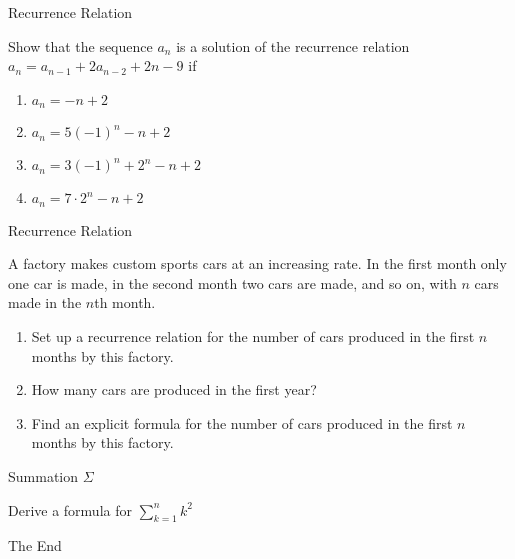 \documentclass{beamer}
\begin{document}
\begin{frame}{Recurrence Relation}
    \begin{example}
        Show that the sequence ${a_n}$ is a solution of the recurrence relation $a_n = a_{n-1} + 2a_{n-2} + 2n - 9$ if \begin{enumerate}
            \item $a_n = -n + 2$
                        
            \vspace{8mm}
            
            \item $a_n = 5(-1)^n - n + 2$
                        
            \vspace{8mm}
            
            \item $a_n = 3(-1)^n + 2^n - n + 2$
                        
            \vspace{8mm}
            
            \item $a_n = 7 \cdot 2^n - n + 2$
                        
            \vspace{10mm}
            
        \end{enumerate}
    \end{example}
\end{frame}

\begin{frame}[t]{Recurrence Relation}
    \begin{example}
        A factory makes custom sports cars at an increasing rate. In the first month only one car is made, in the second month two cars are made, and so on, with $n$ cars made in the $n$th month. 
        \begin{enumerate}
            \item Set up a recurrence relation for the number of cars produced in the first $n$ months by this factory.
            \item How many cars are produced in the first year?
            \item Find an explicit formula for the number of cars produced in the first $n$ months by this factory.
        \end{enumerate}
    \end{example}
\end{frame}

\begin{frame}[t]{Summation $\Sigma$}
    \begin{example}
        Derive a formula for $\sum_{k=1}^{n} k^2$
    \end{example}
\end{frame}


\begin{frame}{}
    \begin{center}
        The End
    \end{center}
\end{frame}
\end{document}
